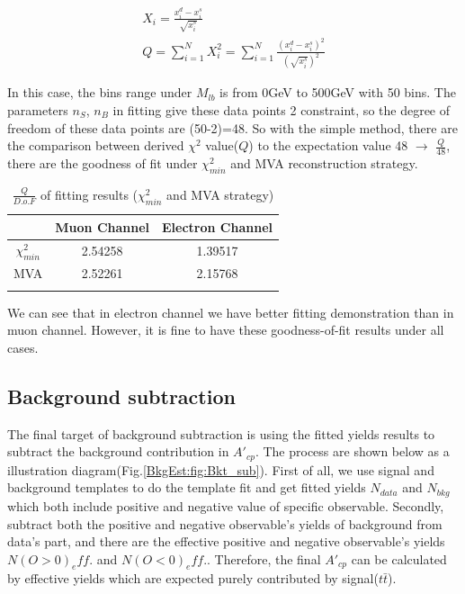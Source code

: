 		\begin{equation}
		\begin{split}
		X_i = \frac{x^d_i - x^s_i}{\sqrt{x^s_i}} \\
		Q = \sum_{i=1}^{N} X_i^2 = \sum_{i=1}^{N} \frac{(x^d_i - x^s_i)^2}{(\sqrt{x^s_i})^2}
		\label{eq:chi2_dis_this}
		\end{split}
		\end{equation}

		In this case, the bins range under $M_{lb}$ is from 0GeV to 500GeV with 50 bins. The parameters $n_S$, $n_B$ in fitting give these data points 2 constraint, so the degree of freedom of these data points are (50-2)=48. So with the simple method, there are the comparison between derived $\chi^2$ value($Q$) to the expectation value 48 $\longrightarrow$ $\frac{Q}{48}$, there are the goodness of fit under $\chi^2_{min}$ and MVA reconstruction strategy.

		\begin{center}
		\begin{longtable}[H]{ c c c }
		\caption{$\frac{Q}{D.o.F}$ of fitting results ($\chi^2_{min}$ and MVA strategy)} \\
		\hline
		 & Muon Channel & Electron Channel \\ 
		\hline
		$\chi^2_{min}$ & 2.54258 & 1.39517 \\
		MVA & 2.52261 & 2.15768 \\
		\hline
		\label{BkgEst:tb:goodness_of_fit}
		\end{longtable}
		\end{center}
		\FloatBarrier

		We can see that in electron channel we have better fitting demonstration than in muon channel. However, it is fine to have these goodness-of-fit results under all cases.

	\subsection{Background subtraction}
	\label{ssec:bkg_sub}

		The final target of background subtraction is using the fitted yields results to subtract the background contribution in $A'_{cp}$. The process are shown below as a illustration diagram(Fig.\ref{BkgEst:fig:Bkt_sub}). First of all, we use signal and background templates to do the template fit and get fitted yields $N_{data}$ and $N_{bkg}$ which both include positive and negative value of specific observable. Secondly, subtract both the positive and negative observable's yields of background from data's part, and there are the effective positive and negative observable's yields $N(O>0)_eff.$ and $N(O<0)_eff.$. Therefore, the final $A'_{cp}$ can be calculated by effective yields which are expected purely contributed by signal($t\bar{t}$).

